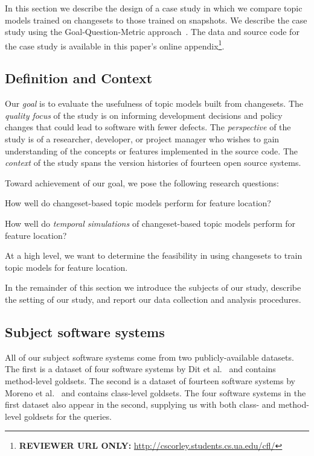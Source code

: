 
In this section we describe the design of a case study in which we
compare topic models trained on changesets to those trained on snapshots.
We describe the case study using the Goal-Question-Metric approach~\cite{Basili-etal:94}.
The data and source code for the case study is available in this paper's online
appendix\footnote{\textbf{REVIEWER URL ONLY:} \url{http://cscorley.students.cs.ua.edu/cfl/}}.

\subsection{Definition and Context}

Our \textit{goal} is to evaluate the usefulness of topic models built
from changesets.
The \textit{quality focus} of the study is on informing development
decisions and policy changes that could lead to software with fewer
defects.
The \textit{perspective} of the study is of a researcher, developer, or
project manager who wishes to gain understanding of the concepts or
features implemented in the source code.
The \textit{context} of the study spans the version histories of fourteen
open source systems.

Toward achievement of our goal, we pose the following research questions:
\begin{description}[font=\itshape\mdseries,leftmargin=10mm,style=sameline]
    \item[RQ1] How well do changeset-based topic models perform for feature location?
    \item[RQ2] How well do \emph{temporal simulations} of changeset-based topic models perform for feature location?
\end{description}
At a high level, we want to determine the feasibility in using changesets
to train topic models for feature location.

In the remainder of this section we introduce the subjects of our study,
describe the setting of our study, and report our data collection and analysis procedures.


\subsection{Subject software systems}

All of our subject software systems come from two publicly-available
datasets.  The first is a dataset of four software systems by Dit et
al.~\cite{Dit:2013} and contains method-level goldsets.  The second is
a dataset of fourteen software systems by Moreno et
al.~\cite{Moreno:2014} and contains class-level goldsets. The four
software systems in the first dataset also appear in the second,
supplying us with both class- and method-level goldsets for the queries.

